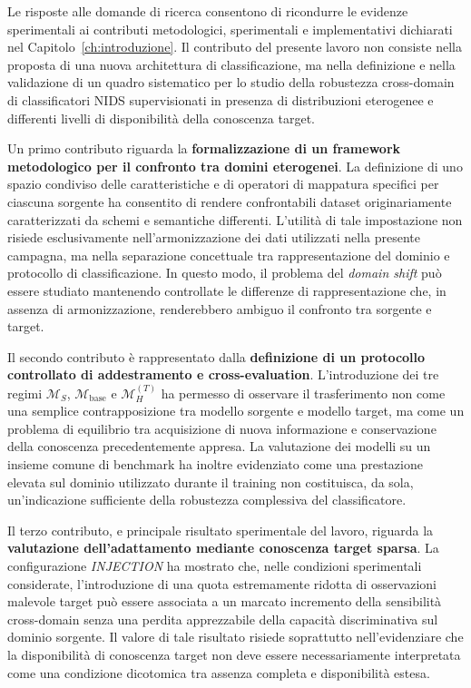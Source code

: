 Le risposte alle domande di ricerca consentono di ricondurre le evidenze sperimentali ai contributi metodologici, sperimentali e implementativi dichiarati nel Capitolo~\ref{ch:introduzione}.
Il contributo del presente lavoro non consiste nella proposta di una nuova architettura di classificazione, ma nella definizione e nella validazione di un quadro sistematico per lo studio della robustezza cross-domain di classificatori NIDS supervisionati in presenza di distribuzioni eterogenee e differenti livelli di disponibilità della conoscenza target.

Un primo contributo riguarda la \textbf{formalizzazione di un framework metodologico per il confronto tra domini eterogenei}.
La definizione di uno spazio condiviso delle caratteristiche e di operatori di mappatura specifici per ciascuna sorgente ha consentito di rendere confrontabili dataset originariamente caratterizzati da schemi e semantiche differenti.
L'utilità di tale impostazione non risiede esclusivamente nell'armonizzazione dei dati utilizzati nella presente campagna, ma nella separazione concettuale tra rappresentazione del dominio e protocollo di classificazione.
In questo modo, il problema del \textit{domain shift} può essere studiato mantenendo controllate le differenze di rappresentazione che, in assenza di armonizzazione, renderebbero ambiguo il confronto tra sorgente e target.

Il secondo contributo è rappresentato dalla \textbf{definizione di un protocollo controllato di addestramento e cross-evaluation}.
L'introduzione dei tre regimi $\mathcal{M}_{S}$, $\mathcal{M}_{\mathrm{base}}$ e $\mathcal{M}_{H}^{(T)}$ ha permesso di osservare il trasferimento non come una semplice contrapposizione tra modello sorgente e modello target, ma come un problema di equilibrio tra acquisizione di nuova informazione e conservazione della conoscenza precedentemente appresa.
La valutazione dei modelli su un insieme comune di benchmark ha inoltre evidenziato come una prestazione elevata sul dominio utilizzato durante il training non costituisca, da sola, un'indicazione sufficiente della robustezza complessiva del classificatore.

Il terzo contributo, e principale risultato sperimentale del lavoro, riguarda la \textbf{valutazione dell'adattamento mediante conoscenza target sparsa}.
La configurazione \textit{INJECTION} ha mostrato che, nelle condizioni sperimentali considerate, l'introduzione di una quota estremamente ridotta di osservazioni malevole target può essere associata a un marcato incremento della sensibilità cross-domain senza una perdita apprezzabile della capacità discriminativa sul dominio sorgente.
Il valore di tale risultato risiede soprattutto nell'evidenziare che la disponibilità di conoscenza target non deve essere necessariamente interpretata come una condizione dicotomica tra assenza completa e disponibilità estesa.

